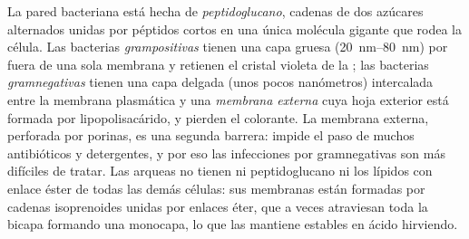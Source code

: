 \begin{proposition}\label{prop:b2:unicellular-diversity:gram}
La pared bacteriana está hecha de \emph{peptidoglucano}, cadenas de dos
azúcares alternados unidas por péptidos cortos en una única molécula
gigante que rodea la célula. Las bacterias \emph{grampositivas} tienen
una capa gruesa (\qtyrange{20}{80}{nm}) por fuera de una sola membrana
y retienen el cristal violeta de la ; las bacterias
\emph{gramnegativas} tienen una capa delgada (unos pocos nanómetros)
intercalada entre la membrana plasmática y una \emph{membrana externa}
cuya hoja exterior está formada por lipopolisacárido, y pierden el
colorante. La membrana externa, perforada por porinas, es una segunda
barrera: impide el paso de muchos antibióticos y detergentes, y por eso
las infecciones por gramnegativas son más difíciles de tratar. Las
arqueas no tienen ni peptidoglucano ni los lípidos con enlace éster de
todas las demás células: sus membranas están formadas por cadenas
isoprenoides unidas por enlaces éter, que a veces atraviesan toda la
bicapa formando una monocapa, lo que las mantiene estables en ácido
hirviendo.
\end{proposition}

